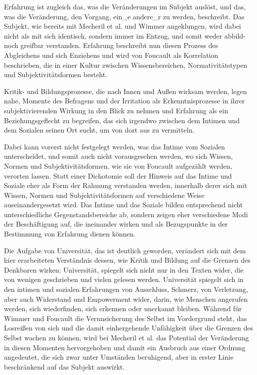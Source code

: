 Erfahrung ist zugleich das, was die Veränderungen im Subjekt
auslöst, und das, was die Veränderung, den Vorgang, ein\_e andere\_r zu werden,
beschreibt. Das Subjekt, wie bereits mit Mecheril et al. und Wimmer
angeklungen, wird dabei nicht als mit sich identisch, sondern immer im Entzug,
und somit weder abbild- noch greifbar verstanden. Erfahrung beschreibt nun
diesen Prozess des Abgleichens und sich Enziehens und wird von Foucault als
Korrelation beschrieben, die \glqq in einer Kultur zwischen Wissensbereichen,
Normativitätstypen und Subjektivitätsformen \grqq \footnotemark
{} besteht. 

Kritik- und
Bildungsprozesse, die nach Innen und Außen wirksam werden, legen nahe, Momente
des Befragens und der Irritation als Erkenntnisprozesse in ihrer
subjektivierenden Wirkung in den Blick zu nehmen und Erfahrung als ein
Beziehungsgeflecht zu begreifen, das sich irgendwo zwischen dem Intimen und dem
Sozialen seinen Ort sucht, um von dort aus zu vermitteln.

Dabei kann vorerst
nicht festgelegt werden, was das Intime vom Sozialen unterscheidet, und somit
auch nicht vorausgesehen werden, wo sich Wissen, Normen und
Subjektivitätsformen, wie sie von Foucault aufgezählt werden, verorten lassen.
Statt einer Dichotomie soll der Hinweis auf das Intime und Soziale eher als
Form der Rahmung verstanden werden, innerhalb derer sich mit Wissen, Normen und
Subjektivitätsformen auf verschiedene Weise auseinandergesetzt wird. Das Intime
und das Soziale bilden entsprechend nicht unterschiedliche Gegenstandsbereiche
ab, sondern zeigen eher verschiedene Modi der Beschäftigung auf, die ineinander
wirken und als Bezugspunkte in der Bestimmung von Erfahrung dienen können. 
 
Die Aufgabe von Universität, das ist deutlich geworden, verändert sich mit dem
hier erarbeiteten Verständnis dessen, wie Kritik und Bildung auf die Grenzen
des Denkbaren wirken: Universität, spiegelt sich nicht nur in den Texten wider,
die von wenigen geschrieben und vielen gelesen werden. Universität spiegelt
sich in den intimen und sozialen Erfahrungen von Ausschluss, Schmerz, von
Verletzung, aber auch Widerstand und Empowerment wider, darin, wie Menschen
angerufen werden, sich wiederfinden, sich erkennen oder unerkannt bleiben.
Während für Wimmer und Foucault die Verunsicherung des Selbst im Vordergrund
steht, das Losreißen von sich und die damit einhergehende Unfähigkeit über die
Grenzen des Selbst wachen zu können, wird bei Mecheril et al. das Potential der
Veränderung in diesen Momenten hervorgehoben und damit ein Ausbruch aus einer
Ordnung angedeutet, die sich zwar unter Umständen beruhigend, aber in erster
Linie beschränkend auf das Subjekt auswirkt. 

